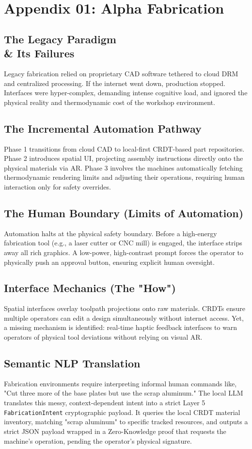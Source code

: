 \chapter{Appendix 01: Alpha Fabrication}

\section{The Legacy Paradigm \\\& Its Failures}
Legacy fabrication relied on proprietary CAD software tethered to cloud DRM and centralized processing. If the internet went down, production stopped. Interfaces were hyper-complex, demanding intense cognitive load, and ignored the physical reality and thermodynamic cost of the workshop environment.

\section{The Incremental Automation Pathway}
Phase 1 transitions from cloud CAD to local-first CRDT-based part repositories. Phase 2 introduces spatial UI, projecting assembly instructions directly onto the physical materials via AR. Phase 3 involves the machines automatically fetching thermodynamic rendering limits and adjusting their operations, requiring human interaction only for safety overrides.

\section{The Human Boundary (Limits of Automation)}
Automation halts at the physical safety boundary. Before a high-energy fabrication tool (e.g., a laser cutter or CNC mill) is engaged, the interface strips away all rich graphics. A low-power, high-contrast prompt forces the operator to physically push an approval button, ensuring explicit human oversight.

\section{Interface Mechanics (The "How")}
Spatial interfaces overlay toolpath projections onto raw materials. CRDTs ensure multiple operators can edit a design simultaneously without internet access. Yet, a missing mechanism is identified: real-time haptic feedback interfaces to warn operators of physical tool deviations without relying on visual AR.

\section{Semantic NLP Translation}
Fabrication environments require interpreting informal human commands like, "Cut three more of the base plates but use the scrap aluminum." The local LLM translates this messy, context-dependent intent into a strict Layer 5 \texttt{FabricationIntent} cryptographic payload. It queries the local CRDT material inventory, matching "scrap aluminum" to specific tracked resources, and outputs a strict JSON payload wrapped in a Zero-Knowledge proof that requests the machine's operation, pending the operator's physical signature.
